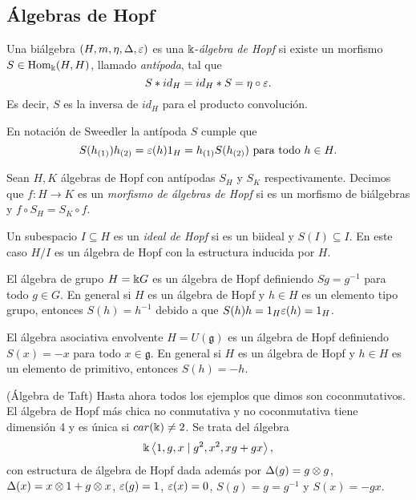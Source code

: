 \documentclass[a4paper,oneside,fleqn,11pt,../tesis.tex]{subfiles}
\begin{document}
\subsection{Álgebras de Hopf}

\begin{definition}
	Una biálgebra $\left(H, m, \eta, \Delta, \varepsilon \right)$ es una $\Bbbk$-\emph{álgebra de Hopf} si existe
	un morfismo $S \in \operatorname{Hom}_{\Bbbk}(H, H)$, llamado \emph{antípoda}, tal que
	\[
		S \ast id_{H}  = id_{H} \ast S = \eta \circ \varepsilon.
	\]
	Es decir, $S$ es la inversa de $id_H$ para el producto convolución.
\end{definition}

En notación de Sweedler la antípoda $S$ cumple que 
\[
	S(h_{(1)})h_{(2)} = \varepsilon(h) 1_{H} = h_{(1)}S(h_{(2)}) \text{ para todo } h \in H.
\]

\begin{definition}
	Sean $H, K$ álgebras de Hopf con antípodas $S_H$ y $S_K$ respectivamente. Decimos que $f: H \to K$
	es un \emph{morfismo de álgebras de Hopf} si es un morfismo de biálgebras y $f \circ S_H = S_K \circ f$.
\end{definition}

\begin{definition}
	Un subespacio $I \subseteq H$ es un \emph{ideal de Hopf} si es un biideal y $S(I) \subseteq I$. En este caso
	$H / I$ es un álgebra de Hopf con la estructura inducida por $H$.
\end{definition}

\begin{example}
	El álgebra de grupo $H = \Bbbk G$ es un álgebra de Hopf definiendo $Sg = g^{-1}$ para todo $g \in G$. En general
	si $H$ es un álgebra de Hopf y $h \in H$ es un elemento tipo grupo, entonces $S(h) = h^{-1}$ debido a que
	$S(h)h = 1_{H} \varepsilon(h) = 1_{H}$.
\end{example}

\begin{example}
	El álgebra asociativa envolvente $H = U(\mathfrak{g})$ es un álgebra de Hopf definiendo $S(x) = -x$ para todo $x \in \mathfrak{g}$.
	En general si $H$ es un álgebra de Hopf y $h \in H$ es un elemento de primitivo, entonces $S(h) = -h$.
\end{example}

\begin{example}
	(Álgebra de Taft) Hasta ahora todos los ejemplos que dimos son coconmutativos. El álgebra de Hopf más chica no conmutativa y no coconmutativa
	tiene dimensión 4 y es única si $car(\Bbbk) \neq 2$. Se trata del álgebra
	\[
		\Bbbk \left\langle 1, g, x \mid g^2, x^2, xg + gx \right\rangle,
	\]
	con estructura de álgebra de Hopf dada además por $\Delta(g) = g \otimes g$, $\Delta(x) = x \otimes 1 + g \otimes x$,
	$\varepsilon(g) = 1$, $\varepsilon(x) = 0$, $S(g) = g = g^{-1}$ y $S(x) = -gx$.
\end{example}
\end{document}
